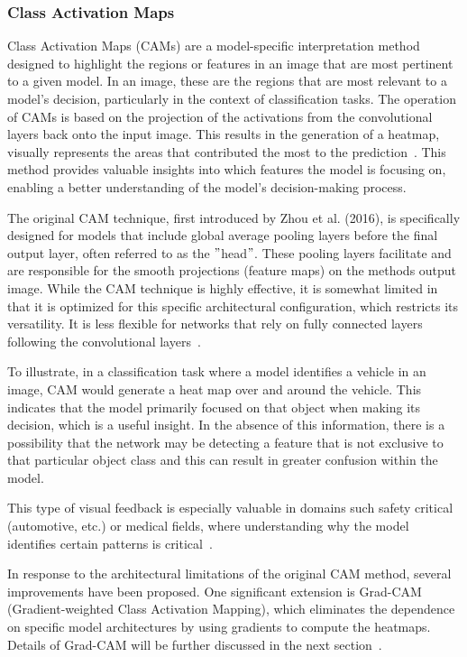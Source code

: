 \subsubsection{Class Activation Maps}\label{subsubsec:CAM}

Class Activation Maps (CAMs) are a model-specific interpretation method designed to highlight the regions or features
in an image that are most pertinent to a given model.
In an image, these are the regions that are most relevant to a model's decision, particularly in the context of classification tasks.
The operation of CAMs is based on the projection of the activations from the convolutional layers back onto the input image.
This results in the generation of a heatmap, visually represents the areas that contributed
the most to the prediction~\cite{Muhammad_2020}.
This method provides valuable insights into which features the model is focusing on, enabling a better understanding of
the model's decision-making process.

The original CAM technique, first introduced by Zhou et al. (2016),
is specifically designed for models that include global average pooling layers before the final output layer,
often referred to as the \("\)head\("\).
These pooling layers facilitate and are responsible for the smooth projections (feature maps) on the methods output image.
While the CAM technique is highly effective, it is somewhat limited in that it is optimized for this specific architectural
configuration, which restricts its versatility.
It is less flexible for networks that rely on fully connected layers following the convolutional layers~\cite{Zhou_2016}.

To illustrate, in a classification task where a model identifies a vehicle in an image, CAM would generate a heat map over and around the vehicle.
This indicates that the model primarily focused on that object when making its decision, which is a useful insight.
In the absence of this information, there is a possibility that the network may be detecting a feature that is not
exclusive to that particular object class and this can result in greater confusion within the model.

This type of visual feedback is especially valuable in domains such safety critical (automotive, etc.) or medical fields,
where understanding why the model identifies certain patterns is critical~\cite{Muhammad_2020}.

In response to the architectural limitations of the original CAM method, several improvements have been proposed.
One significant extension is Grad-CAM (Gradient-weighted Class Activation Mapping), which eliminates the dependence
on specific model architectures by using gradients to compute the heatmaps.
Details of Grad-CAM will be further discussed in the next section~\cite{Selvaraju_2019}.

